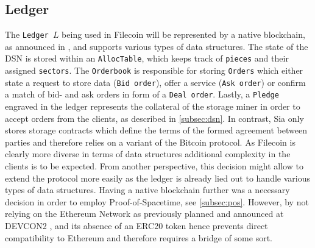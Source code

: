 \documentclass[conference]{IEEEtran}
\begin{document}
\subsection{Ledger}
\label{subsec:ledger}
The \texttt{Ledger $L$} being used in Filecoin will be represented by a native blockchain, as announced in \cite{filecoin-investor-faq}, and supports various types of data structures.
The state of the DSN is stored within an \texttt{AllocTable}, which keeps track of \texttt{pieces} and their assigned \texttt{sectors}.
The \texttt{Orderbook} is responsible for storing \texttt{Orders} which either state a request to store data (\texttt{Bid order}), offer a service (\texttt{Ask order}) or confirm a match of bid- and ask orders in form of a \texttt{Deal order}.
Lastly, a \texttt{Pledge} engraved in the ledger represents the collateral of the storage miner in order to accept orders from the clients, as described in \ref{subsec:dsn}.
In contrast, Sia only stores storage contracts which define the terms of the formed agreement between parties and therefore relies on a variant of the Bitcoin protocol\cite{bitcoin}.
As Filecoin is clearly more diverse in terms of data structures additional complexity in the clients is to be expected.
From another perspective, this decision might allow to extend the protocol more easily as the ledger is already lied out to handle various types of data structures.
Having a native blockchain further was a necessary decision in order to employ Proof-of-Spacetime, see \ref{subsec:pos}.
However, by not relying on the Ethereum Network \cite{ethereum} as previously planned and announced at DEVCON2 \cite{devcon2}, and its absence of an ERC20 token \cite{erc20} hence prevents direct compatibility to Ethereum and therefore requires a bridge of some sort.

\end{document}
